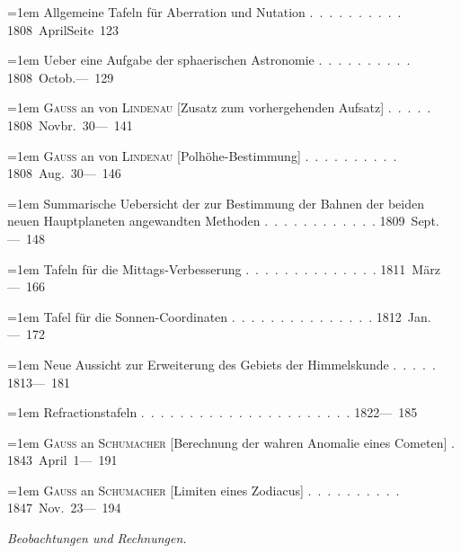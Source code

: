 \clearpage
{}
\begingroup
\raggedright
\noindent\hangindent=1em Allgemeine Tafeln für Aberration und Nutation \mbox{.\ .\ .\ .\ .\ .\ .\ .\ .\ .} \hfill\mbox{1808 April}\quad\mbox{Seite 123}\par\smallskip
\noindent\hangindent=1em Ueber eine Aufgabe der sphaerischen Astronomie \mbox{.\ .\ .\ .\ .\ .\ .\ .\ .\ .} \hfill\mbox{1808 Octob.}\quad\mbox{--- 129}\par\smallskip
\noindent\hangindent=1em \textsc{Gauss} an von \textsc{Lindenau} [Zusatz zum vorhergehenden Aufsatz] \mbox{.\ .\ .\ .\ .} \hfill\mbox{1808 Novbr. 30}\quad\mbox{--- 141}\par\smallskip
\noindent\hangindent=1em \textsc{Gauss} an von \textsc{Lindenau} [Polhöhe-Bestimmung] \mbox{.\ .\ .\ .\ .\ .\ .\ .\ .\ .} \hfill\mbox{1808 Aug. 30}\quad\mbox{--- 146}\par\smallskip
\noindent\hangindent=1em Summarische Uebersicht der zur Bestimmung der Bahnen der beiden neuen Hauptplaneten angewandten Methoden \mbox{.\ .\ .\ .\ .\ .\ .\ .\ .\ .\ .\ .} \hfill\mbox{1809 Sept.}\quad\mbox{--- 148}\par\smallskip
\noindent\hangindent=1em Tafeln für die Mittags-Verbesserung \mbox{.\ .\ .\ .\ .\ .\ .\ .\ .\ .\ .\ .\ .\ .} \hfill\mbox{1811 März}\quad\mbox{--- 166}\par\smallskip
\noindent\hangindent=1em Tafel für die Sonnen-Coordinaten \mbox{.\ .\ .\ .\ .\ .\ .\ .\ .\ .\ .\ .\ .\ .\ .} \hfill\mbox{1812 Jan.}\quad\mbox{--- 172}\par\smallskip
\noindent\hangindent=1em Neue Aussicht zur Erweiterung des Gebiets der Himmelskunde \mbox{.\ .\ .\ .\ .} \hfill\mbox{1813}\quad\mbox{--- 181}\par\smallskip
\noindent\hangindent=1em Refractionstafeln \mbox{.\ .\ .\ .\ .\ .\ .\ .\ .\ .\ .\ .\ .\ .\ .\ .\ .\ .\ .\ .\ .\ .} \hfill\mbox{1822}\quad\mbox{--- 185}\par\smallskip
\noindent\hangindent=1em \textsc{Gauss} an \textsc{Schumacher} [Berechnung der wahren Anomalie eines Cometen] \mbox{.} \hfill\mbox{1843 April 1}\quad\mbox{--- 191}\par\smallskip
\noindent\hangindent=1em \textsc{Gauss} an \textsc{Schumacher} [Limiten eines Zodiacus] \mbox{.\ .\ .\ .\ .\ .\ .\ .\ .\ .} \hfill\mbox{1847 Nov. 23}\quad\mbox{--- 194}\par\smallskip
\par\medskip
\noindent\textit{Beobachtungen und Rechnungen.}\par\smallskip\nopagebreak[4]

